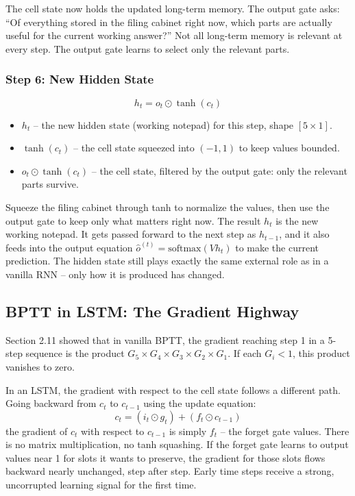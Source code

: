 The cell state now holds the updated long-term memory. The output gate asks: ``Of
everything stored in the filing cabinet right now, which parts are actually useful
for the current working answer?'' Not all long-term memory is relevant at every step.
The output gate learns to select only the relevant parts.

\subsubsection{Step 6: New Hidden State}

\[
h_t = o_t \odot \tanh(c_t)
\]

\begin{itemize}
    \item $h_t$ -- the new hidden state (working notepad) for this step, shape
    $[5 \times 1]$.
    \item $\tanh(c_t)$ -- the cell state squeezed into $(-1, 1)$ to keep values
    bounded.
    \item $o_t \odot \tanh(c_t)$ -- the cell state, filtered by the output gate:
    only the relevant parts survive.
\end{itemize}

Squeeze the filing cabinet through tanh to normalize the values, then use the output
gate to keep only what matters right now. The result $h_t$ is the new working
notepad. It gets passed forward to the next step as $h_{t-1}$, and it also feeds into
the output equation $\hat{o}^{(t)} = \text{softmax}(V h_t)$ to make the current
prediction. The hidden state still plays exactly the same external role as in a vanilla
RNN -- only how it is produced has changed.

\subsection{BPTT in LSTM: The Gradient Highway}

Section 2.11 showed that in vanilla BPTT, the gradient reaching step 1 in a 5-step
sequence is the product $G_5 \times G_4 \times G_3 \times G_2 \times G_1$. If each
$G_i < 1$, this product vanishes to zero.

In an LSTM, the gradient with respect to the cell state follows a different path. Going
backward from $c_t$ to $c_{t-1}$ using the update equation:
\[
c_t = (i_t \odot g_t) + (f_t \odot c_{t-1})
\]
the gradient of $c_t$ with respect to $c_{t-1}$ is simply $f_t$ -- the forget gate
values. There is no matrix multiplication, no tanh squashing. If the forget gate
learns to output values near 1 for slots it wants to preserve, the gradient for those
slots flows backward nearly unchanged, step after step. Early time steps receive a
strong, uncorrupted learning signal for the first time.

